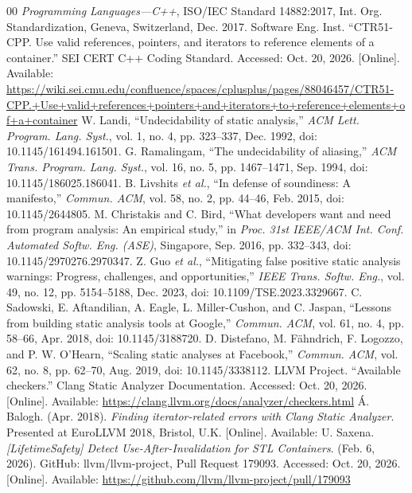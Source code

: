 \documentclass[conference]{IEEEtran}
\begin{document}
\begin{thebibliography}{00}
 \textit{Programming Languages---C++}, ISO/IEC Standard 14882:2017, Int. Org. Standardization, Geneva, Switzerland, Dec. 2017.
 Software Eng. Inst. ``CTR51-CPP. Use valid references, pointers, and iterators to reference elements of a container.'' SEI CERT C++ Coding Standard. Accessed: Oct. 20, 2026. [Online]. Available: \url{https://wiki.sei.cmu.edu/confluence/spaces/cplusplus/pages/88046457/CTR51-CPP.+Use+valid+references+pointers+and+iterators+to+reference+elements+of+a+container}
 W. Landi, ``Undecidability of static analysis,'' \textit{ACM Lett. Program. Lang. Syst.}, vol. 1, no. 4, pp. 323--337, Dec. 1992, doi: 10.1145/161494.161501.
 G. Ramalingam, ``The undecidability of aliasing,'' \textit{ACM Trans. Program. Lang. Syst.}, vol. 16, no. 5, pp. 1467--1471, Sep. 1994, doi: 10.1145/186025.186041.
 B. Livshits \textit{et al.}, ``In defense of soundiness: A manifesto,'' \textit{Commun. ACM}, vol. 58, no. 2, pp. 44--46, Feb. 2015, doi: 10.1145/2644805.
 M. Christakis and C. Bird, ``What developers want and need from program analysis: An empirical study,'' in \textit{Proc. 31st IEEE/ACM Int. Conf. Automated Softw. Eng. (ASE)}, Singapore, Sep. 2016, pp. 332--343, doi: 10.1145/2970276.2970347.
 Z. Guo \textit{et al.}, ``Mitigating false positive static analysis warnings: Progress, challenges, and opportunities,'' \textit{IEEE Trans. Softw. Eng.}, vol. 49, no. 12, pp. 5154--5188, Dec. 2023, doi: 10.1109/TSE.2023.3329667.
 C. Sadowski, E. Aftandilian, A. Eagle, L. Miller-Cushon, and C. Jaspan, ``Lessons from building static analysis tools at Google,'' \textit{Commun. ACM}, vol. 61, no. 4, pp. 58--66, Apr. 2018, doi: 10.1145/3188720.
 D. Distefano, M. Fähndrich, F. Logozzo, and P. W. O'Hearn, ``Scaling static analyses at Facebook,'' \textit{Commun. ACM}, vol. 62, no. 8, pp. 62--70, Aug. 2019, doi: 10.1145/3338112.
 LLVM Project. ``Available checkers.'' Clang Static Analyzer Documentation. Accessed: Oct. 20, 2026. [Online]. Available: \url{https://clang.llvm.org/docs/analyzer/checkers.html}
 \'{A}. Balogh. (Apr. 2018). \textit{Finding iterator-related errors with Clang Static Analyzer}. Presented at EuroLLVM 2018, Bristol, U.K. [Online]. Available: \urlbalogh
{} U. Saxena. \textit{[LifetimeSafety] Detect Use-After-Invalidation for STL Containers}. (Feb. 6, 2026). GitHub: llvm/llvm-project, Pull Request 179093. Accessed: Oct. 20, 2026. [Online]. Available: \url{https://github.com/llvm/llvm-project/pull/179093}

\end{thebibliography}
\end{document}
